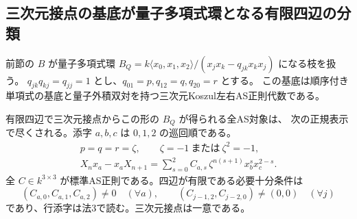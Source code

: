 \subsection{三次元接点の基底が量子多項式環となる有限四辺の分類}
\label{sec:quantum-tangent-windows}
前節の $B$ が量子多項式環
$B_Q=k\langle x_0,x_1,x_2\rangle/(x_jx_k-q_{jk}x_kx_j)$ になる枝を扱う。
$q_{jk}q_{kj}=q_{jj}=1$ とし、$q_{01}=p,q_{12}=q,q_{20}=r$ とする。
この基底は順序付き単項式の基底と量子外積双対を持つ三次元Koszul左右AS正則代数である。

\begin{theorem}\label{thm:quantum-tangent-finite}
有限四辺で三次元接点からこの形の $B_Q$ が得られる全AS対象は、
次の正規表示で尽くされる。添字 $a,b,c$ は $0,1,2$ の巡回順である。
\begin{gather*}
 p=q=r=\zeta,\qquad \zeta=-1\ \text{または}\ \zeta^2=-1,\\
 X_n x_a-x_a X_{n+1}
  =\sum_{s=0}^2 C_{a,s}\,\zeta^{n(s+1)}x_b^s x_c^{2-s}.
\end{gather*}
全 $C\in k^{3\times3}$ が標準AS正則である。四辺が有限である必要十分条件は
\[
 (C_{a,0},C_{a,1},C_{a,2})\ne0\quad(\forall a),\qquad
 (C_{j-1,2},C_{j-2,0})\ne(0,0)\quad(\forall j)
\]
であり、行添字は法3で読む。三次元接点は一意である。
\end{theorem}
